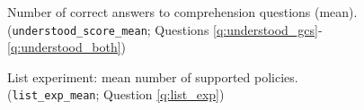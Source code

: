 \begin{figure}[h!]
    \cprotect\caption[Comprehension score]{Number of correct answers to comprehension questions (mean). (\verb|understood_score_mean|; %
    Questions \ref{q:understood_gcs}-\ref{q:understood_both})}\label{fig:understood_score}
\end{figure}



\begin{figure}[h!]
    \cprotect\caption[List experiment]{List experiment: mean number of supported policies. (\verb|list_exp_mean|; %
    Question \ref{q:list_exp})}\label{fig:list_exp}
\end{figure}


